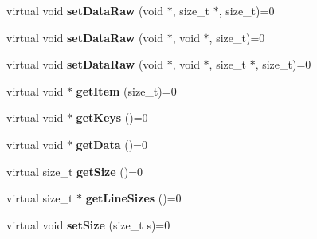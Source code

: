 \begin{DoxyCompactItemize}
\item 
\hypertarget{classfaster_1_1workerFddBase_acb1d91424c30dfc596b2e437605fa613}{}virtual void {\bfseries set\+Data\+Raw} (void $\ast$, size\+\_\+t $\ast$, size\+\_\+t)=0\label{classfaster_1_1workerFddBase_acb1d91424c30dfc596b2e437605fa613}

\item 
\hypertarget{classfaster_1_1workerFddBase_a9a6dd9e0a89281b14486c685ff15d22b}{}virtual void {\bfseries set\+Data\+Raw} (void $\ast$, void $\ast$, size\+\_\+t)=0\label{classfaster_1_1workerFddBase_a9a6dd9e0a89281b14486c685ff15d22b}

\item 
\hypertarget{classfaster_1_1workerFddBase_a5d73e6097368101ce3af5eef1309bdff}{}virtual void {\bfseries set\+Data\+Raw} (void $\ast$, void $\ast$, size\+\_\+t $\ast$, size\+\_\+t)=0\label{classfaster_1_1workerFddBase_a5d73e6097368101ce3af5eef1309bdff}

\item 
\hypertarget{classfaster_1_1workerFddBase_a602b1ad564266ed18e873e24f1418e1b}{}virtual void $\ast$ {\bfseries get\+Item} (size\+\_\+t)=0\label{classfaster_1_1workerFddBase_a602b1ad564266ed18e873e24f1418e1b}

\item 
\hypertarget{classfaster_1_1workerFddBase_a65ea9b06048b3cef3757aec9738ec07f}{}virtual void $\ast$ {\bfseries get\+Keys} ()=0\label{classfaster_1_1workerFddBase_a65ea9b06048b3cef3757aec9738ec07f}

\item 
\hypertarget{classfaster_1_1workerFddBase_af315b09bb75b414d4840c4d0fd3d307f}{}virtual void $\ast$ {\bfseries get\+Data} ()=0\label{classfaster_1_1workerFddBase_af315b09bb75b414d4840c4d0fd3d307f}

\item 
\hypertarget{classfaster_1_1workerFddBase_ab3b64bebf2d7046a583b1e391ba69d1a}{}virtual size\+\_\+t {\bfseries get\+Size} ()=0\label{classfaster_1_1workerFddBase_ab3b64bebf2d7046a583b1e391ba69d1a}

\item 
\hypertarget{classfaster_1_1workerFddBase_a9ae5dce20da30fb989599257ab940bf8}{}virtual size\+\_\+t $\ast$ {\bfseries get\+Line\+Sizes} ()=0\label{classfaster_1_1workerFddBase_a9ae5dce20da30fb989599257ab940bf8}

\item 
\hypertarget{classfaster_1_1workerFddBase_ad0ce609bfa4571280c01ff618b2f6706}{}virtual void {\bfseries set\+Size} (size\+\_\+t s)=0\label{classfaster_1_1workerFddBase_ad0ce609bfa4571280c01ff618b2f6706}


\end{DoxyCompactItemize}
